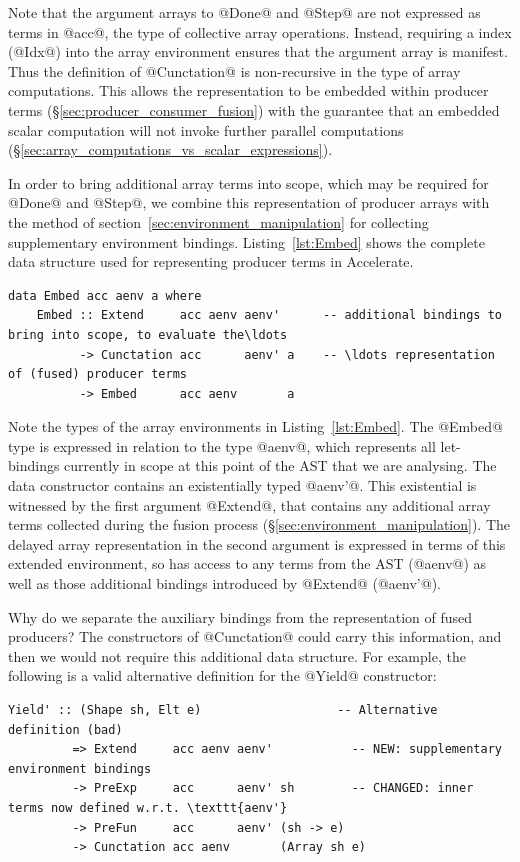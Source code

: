 Note that the argument arrays to @Done@ and @Step@ are not expressed as terms in
@acc@, the type of collective array operations. Instead, requiring a  index (@Idx@) into the array environment ensures that the argument array
is manifest. Thus the definition of @Cunctation@ is non-recursive in the type of
array computations. This allows the representation to be embedded within
producer terms (\S\ref{sec:producer_consumer_fusion}) with the guarantee that an
embedded scalar computation will not invoke further parallel computations
(\S\ref{sec:array_computations_vs_scalar_expressions}).

In order to bring additional array terms into scope, which may be required for
@Done@ and @Step@, we combine this representation of producer arrays with the
method of section~\ref{sec:environment_manipulation} for collecting
supplementary environment bindings. Listing~\ref{lst:Embed} shows the complete
data structure used for representing producer terms in Accelerate.
%
\begin{lstlisting}[style=haskell_float
    ,label=lst:Embed
    ,caption={Representation of fused producer arrays}]
data Embed acc aenv a where
    Embed :: Extend     acc aenv aenv'      -- additional bindings to bring into scope, to evaluate the\ldots
          -> Cunctation acc      aenv' a    -- \ldots representation of (fused) producer terms
          -> Embed      acc aenv       a
\end{lstlisting}

Note the types of the array environments in Listing~\ref{lst:Embed}. The @Embed@
type is expressed in relation to the type @aenv@, which represents all
let-bindings currently in scope at this point of the AST that we are analysing. The data constructor contains an
existentially typed @aenv'@. This existential is witnessed by the first argument
@Extend@, that contains any additional array terms collected during the fusion
process (\S\ref{sec:environment_manipulation}). The delayed array representation
in the second argument is expressed in terms of this extended environment, so
has access to any terms from the AST (@aenv@) as well as those additional
bindings introduced by @Extend@ (@aenv'@).

Why do we separate the auxiliary bindings from the representation of fused
producers? The constructors of @Cunctation@ could carry this information,
and then we would not require this additional data structure. For example, the
following is a valid alternative definition for the @Yield@ constructor:
%
\begin{lstlisting}[style=haskell]
  Yield' :: (Shape sh, Elt e)                   -- Alternative definition (bad)
         => Extend     acc aenv aenv'           -- NEW: supplementary environment bindings
         -> PreExp     acc      aenv' sh        -- CHANGED: inner terms now defined w.r.t. \texttt{aenv'}
         -> PreFun     acc      aenv' (sh -> e)
         -> Cunctation acc aenv       (Array sh e)
\end{lstlisting}

